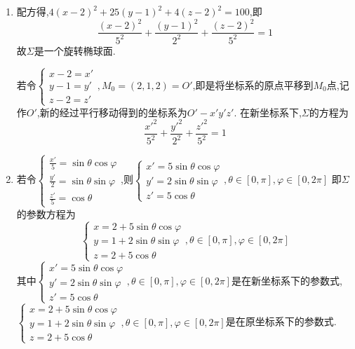 \begin{solution}
\begin{enumerate}
    \item 配方得,$4(x-2)^2+25(y-1)^2+4(z-2)^2 = 100$,即
    $$
    \frac{(x-2)^2}{5^2}+\frac{(y-1)^2}{2^2}+\frac{(z-2)^2}{5^2} = 1
    $$
    故$\Sigma$是一个旋转椭球面.

    若令$\begin{cases}
        x-2 = x'\\
        y-1 = y'\\
        z-2 = z'
    \end{cases},M_0 = (2,1,2)=O'$,即是将坐标系的原点平移到$M_0$点,记作$O'$,新的经过平行移动得到的坐标系为$O'-x'y'z'$.
    在新坐标系下,$\Sigma$的方程为
    $$
    \frac{x'^2}{5^2}+\frac{y'^2}{2^2}+\frac{z'^2}{5^2} = 1
    $$
    \item 若令$\begin{cases}
        \frac{x'}{5} = \sin \theta \cos \varphi\\
        \frac{y'}{2} = \sin \theta \sin \varphi\\
        \frac{z'}{5} = \cos \theta
    \end{cases}$,则$\begin{cases}
        x' = 5\sin \theta \cos \varphi\\
        y' = 2\sin \theta \sin \varphi\\
        z' = 5\cos \theta
    \end{cases}, \theta \in [0,\pi],\varphi \in [0,2\pi]$
    即$\Sigma$的参数方程为
    $$
    \begin{cases}
        x = 2 + 5 \sin \theta \cos \varphi\\
        y = 1 + 2 \sin \theta \sin \varphi\\
        z = 2 + 5 \cos \theta
    \end{cases}, \theta \in [0,\pi],\varphi \in [0,2\pi]
    $$
    其中$\begin{cases}
        x' = 5\sin \theta \cos \varphi\\
        y' = 2\sin \theta \sin \varphi\\
        z' = 5\cos \theta
    \end{cases}, \theta \in [0,\pi],\varphi \in [0,2\pi]$是在新坐标系下的参数式,
    $\begin{cases}
        x = 2 + 5 \sin \theta \cos \varphi\\
        y = 1 + 2 \sin \theta \sin \varphi\\
        z = 2 + 5 \cos \theta
    \end{cases}, \theta \in [0,\pi],\varphi \in [0,2\pi]$是在原坐标系下的参数式.
\end{enumerate}
\end{solution}

